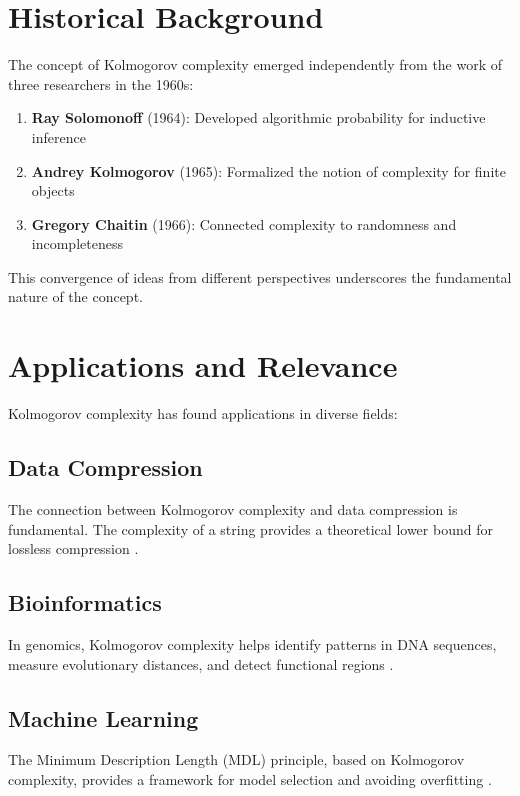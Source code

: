 \documentclass[12pt,a4paper]{report}
\begin{document}
\section{Historical Background}

The concept of Kolmogorov complexity emerged independently from the work of three researchers in the 1960s:

\begin{enumerate}
    \item \textbf{Ray Solomonoff} (1964): Developed algorithmic probability for inductive inference \cite{solomonoff1964formal}
    \item \textbf{Andrey Kolmogorov} (1965): Formalized the notion of complexity for finite objects \cite{kolmogorov1965three}
    \item \textbf{Gregory Chaitin} (1966): Connected complexity to randomness and incompleteness \cite{chaitin1966length}
\end{enumerate}

This convergence of ideas from different perspectives underscores the fundamental nature of the concept.

\section{Applications and Relevance}

Kolmogorov complexity has found applications in diverse fields:

\subsection{Data Compression}
The connection between Kolmogorov complexity and data compression is fundamental. The complexity of a string provides a theoretical lower bound for lossless compression \cite{vitanyi2000minimum}.

\subsection{Bioinformatics}
In genomics, Kolmogorov complexity helps identify patterns in DNA sequences, measure evolutionary distances, and detect functional regions \cite{li2004similarity}.

\subsection{Machine Learning}
The Minimum Description Length (MDL) principle, based on Kolmogorov complexity, provides a framework for model selection and avoiding overfitting \cite{grunwald2007minimum}.
\end{document}
